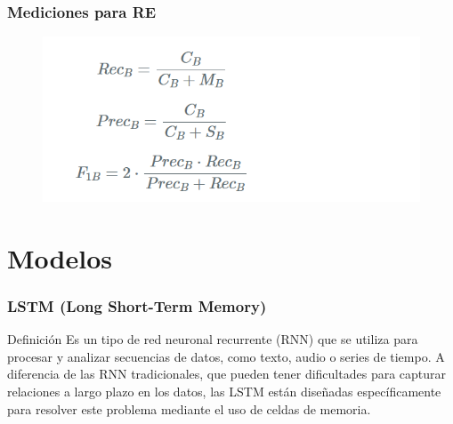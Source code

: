 \documentclass[
11pt, %
%
aspectratio=169, %
]{beamer}
\begin{document}
		\begin{frame}
		\frametitle{Mediciones para RE}
		
		\begin{figure}[h!]
			\centering
			\includegraphics[scale=0.5]{../images/escenario_3}
		\end{figure} 	
		
	\end{frame}
	\section{Modelos}
	
	\begin{frame}
		\frametitle{LSTM (Long Short-Term Memory)}
		\begin{block}{Definici\'on}
			Es un tipo de red neuronal recurrente (RNN) que se utiliza para procesar y analizar secuencias de datos, como texto, audio o series de tiempo. A diferencia de las RNN tradicionales, que pueden tener dificultades para capturar relaciones a largo plazo en los datos, las LSTM están diseñadas específicamente para resolver este problema mediante el uso de celdas de memoria.
		\end{block}
	
		
		
		
	\end{frame}
	
\end{document}
